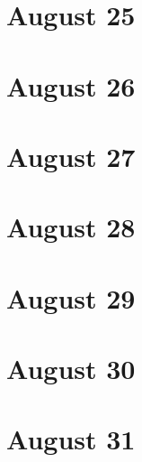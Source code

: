 \section{August 25}

\section{August 26}

\section{August 27}

\section{August 28}

\section{August 29}

\section{August 30}

\section{August 31}

